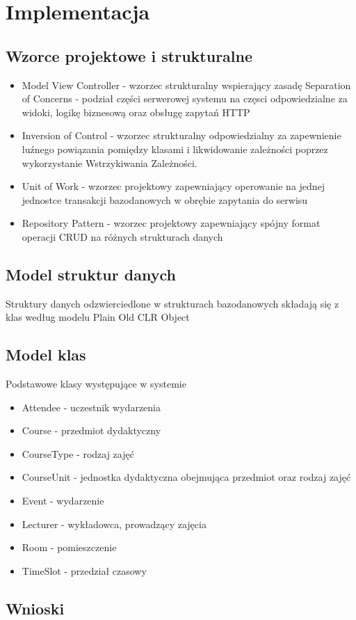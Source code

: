 \newpage\section{Implementacja} \label{sec:implementacja}
\subsection{Wzorce projektowe i strukturalne}
\begin{itemize}  
    \item Model View Controller - wzorzec strukturalny wspierający zasadę Separation of Concerns - podział części serwerowej systemu na częsci odpowiedzialne za widoki, logikę biznesową oraz obsługę zapytań HTTP
    \item Inversion of Control - wzorzec strukturalny odpowiedzialny za zapewnienie luźnego powiązania pomiędzy klasami i likwidowanie zależności poprzez wykorzystanie Wstrzykiwania Zależności.
    \item Unit of Work - wzorzec projektowy zapewniający operowanie na jednej jednostce transakcji bazodanowych w obrębie zapytania do serwisu
    \item Repository Pattern - wzorzec projektowy zapewniający spójny format operacji CRUD na różnych strukturach danych 
\end{itemize}
\subsection{Model struktur danych}
Struktury danych odzwierciedlone w strukturach bazodanowych składają się z klas według modelu Plain Old CLR Object
\subsection{Model klas}
Podstawowe klasy występujące w systemie
\begin{itemize}
    \item Attendee - uczestnik wydarzenia
    \item Course - przedmiot dydaktyczny
    \item CourseType - rodzaj zajęć
    \item CourseUnit - jednostka dydaktyczna obejmująca przedmiot oraz rodzaj zajęć
    \item Event - wydarzenie
    \item Lecturer - wykładowca, prowadzący zajęcia
    \item Room - pomieszczenie
    \item TimeSlot - przedział czasowy
\end{itemize}
\subsection{Wnioski}




 
